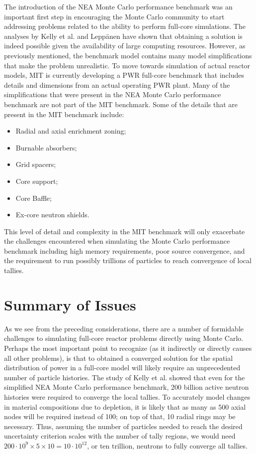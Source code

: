 The introduction of the NEA Monte Carlo performance benchmark was an important
first step in encouraging the Monte Carlo community to start addressing problems
related to the ability to perform full-core simulations. The analyses by Kelly
et al. and Leppänen have shown that obtaining a solution is indeed possible
given the availability of large computing resources. However, as previously
mentioned, the benchmark model contains many model simplifications that make the
problem unrealistic. To move towards simulation of actual reactor models, MIT is
currently developing a PWR full-core benchmark that includes details and
dimensions from an actual operating PWR plant. Many of the simplifications that
were present in the NEA Monte Carlo performance benchmark are not part of the
MIT benchmark. Some of the details that are present in the MIT benchmark
include:
\begin{itemize}
\item Radial and axial enrichment zoning;
\item Burnable absorbers;
\item Grid spacers;
\item Core support;
\item Core Baffle;
\item Ex-core neutron shields.
\end{itemize}
This level of detail and complexity in the MIT benchmark will only exacerbate
the challenges encountered when simulating the Monte Carlo performance benchmark
including high memory requirements, poor source convergence, and the requirement
to run possibly trillions of particles to reach convergence of local tallies.

\section{Summary of Issues}

As we see from the preceding considerations, there are a number of formidable
challenges to simulating full-core reactor problems directly using Monte
Carlo. Perhaps the most important point to recognize (as it indirectly or
directly causes all other problems), is that to obtained a converged solution
for the spatial distribution of power in a full-core model will likely require
an unprecedented number of particle histories. The study of Kelly et
al. \cite{physor-kelly-2012} showed that even for the simplified NEA Monte Carlo
performance benchmark, 200 billion active neutron histories were required to
converge the local tallies. To accurately model changes in material compositions
due to depletion, it is likely that as many as 500 axial nodes will be required
instead of 100; on top of that, 10 radial rings may be necessary. Thus, assuming
the number of particles needed to reach the desired uncertainty criterion scales
with the number of tally regions, we would need $200 \cdot 10^9 \times 5 \times
10 = 10 \cdot 10^{12}$, or ten trillion, neutrons to fully converge all tallies.

